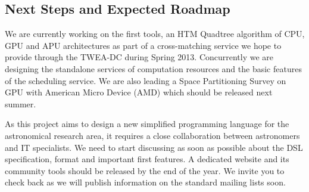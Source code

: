 		\subsection{Next Steps and Expected Roadmap}
			We are currently working on the first tools, an HTM Quadtree algorithm of CPU, GPU and APU architectures as part of a cross-matching service we hope to provide through the TWEA-DC during Spring 2013. Concurrently we are designing the standalone services of computation resources and the basic features of the scheduling service. We are also leading a Space Partitioning Survey on GPU with American Micro Device (AMD) which should be released next summer.
			
			As this project aims to design a new simplified programming language for the astronomical research area, it requires a close collaboration between astronomers and IT specialists. We need to start discussing as soon as possible about the DSL specification, format and important first features. A dedicated website and its community tools should be released by the end of the year. We invite you to check back as we will publish information on the standard mailing lists soon.


